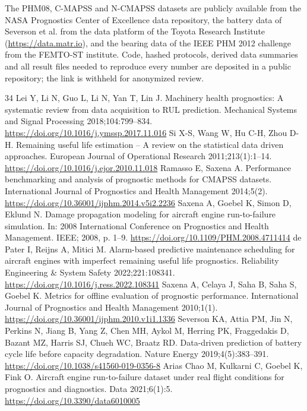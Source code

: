 \documentclass[a4paper,fleqn,doubleblind]{cas-dc}
\begin{document}
\noindent The PHM08, C-MAPSS and N-CMAPSS datasets are publicly available from the NASA Prognostics Center of Excellence data repository, the battery data of Severson et al. \cite{severson2019} from the data platform of the Toyota Research Institute (\url{https://data.matr.io}), and the bearing data of the IEEE PHM 2012 challenge \cite{nectoux2012} from the FEMTO-ST institute. Code, hashed protocols, derived data summaries and all result files needed to reproduce every number are deposited in a public repository; the link is withheld for anonymized review.

\begin{thebibliography}{34}
 Lei Y, Li N, Guo L, Li N, Yan T, Lin J. Machinery health prognostics: A systematic review from data acquisition to RUL prediction. Mechanical Systems and Signal Processing 2018;104:799--834. \url{https://doi.org/10.1016/j.ymssp.2017.11.016}
 Si X-S, Wang W, Hu C-H, Zhou D-H. Remaining useful life estimation -- A review on the statistical data driven approaches. European Journal of Operational Research 2011;213(1):1--14. \url{https://doi.org/10.1016/j.ejor.2010.11.018}
 Ramasso E, Saxena A. Performance benchmarking and analysis of prognostic methods for CMAPSS datasets. International Journal of Prognostics and Health Management 2014;5(2). \url{https://doi.org/10.36001/ijphm.2014.v5i2.2236}
 Saxena A, Goebel K, Simon D, Eklund N. Damage propagation modeling for aircraft engine run-to-failure simulation. In: 2008 International Conference on Prognostics and Health Management. IEEE; 2008, p. 1--9. \url{https://doi.org/10.1109/PHM.2008.4711414}
 de Pater I, Reijns A, Mitici M. Alarm-based predictive maintenance scheduling for aircraft engines with imperfect remaining useful life prognostics. Reliability Engineering \& System Safety 2022;221:108341. \url{https://doi.org/10.1016/j.ress.2022.108341}
 Saxena A, Celaya J, Saha B, Saha S, Goebel K. Metrics for offline evaluation of prognostic performance. International Journal of Prognostics and Health Management 2010;1(1). \url{https://doi.org/10.36001/ijphm.2010.v1i1.1336}
 Severson KA, Attia PM, Jin N, Perkins N, Jiang B, Yang Z, Chen MH, Aykol M, Herring PK, Fraggedakis D, Bazant MZ, Harris SJ, Chueh WC, Braatz RD. Data-driven prediction of battery cycle life before capacity degradation. Nature Energy 2019;4(5):383--391. \url{https://doi.org/10.1038/s41560-019-0356-8}
 Arias Chao M, Kulkarni C, Goebel K, Fink O. Aircraft engine run-to-failure dataset under real flight conditions for prognostics and diagnostics. Data 2021;6(1):5. \url{https://doi.org/10.3390/data6010005}

\end{thebibliography}
\end{document}
